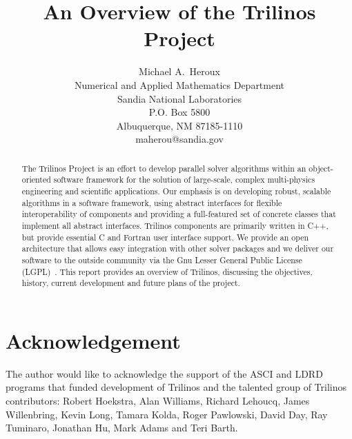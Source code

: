 \documentclass[12pt,strict]{SANDreport}
\title{An Overview of the Trilinos Project}
\author{Michael A.~Heroux\\
       Numerical and Applied Mathematics Department \\
	  Sandia National Laboratories\\
	  P.O. Box 5800\\
	  Albuquerque, NM 87185-1110 \\
	  maherou@sandia.gov \\
	 }
\date{}
\begin{document}
    \maketitle

    \begin{abstract}
The Trilinos Project is an effort to develop parallel solver algorithms within 
an object-oriented software framework for the solution of large-scale, complex
multi-physics engineering and scientific applications.   Our emphasis is on 
developing robust, scalable algorithms in a software framework, using abstract 
interfaces for flexible interoperability of components and providing a 
full-featured set of concrete classes that implement all abstract interfaces. 
Trilinos components are primarily written in C++, but provide essential C and 
Fortran user interface support.  We provide an open architecture that allows 
easy integration with other solver packages and we deliver our software to 
the outside community via the Gnu Lesser General Public License
(LGPL)~\cite{gnu-license-site}.
This report provides an overview of Trilinos, discussing the objectives, history,
current development and future plans of the project.
    \end{abstract}


    \clearpage
    \section*{Acknowledgement}
The author would like to acknowledge the support of the ASCI and LDRD programs
that funded development of Trilinos and the talented group of Trilinos contributors: 
Robert Hoekstra, Alan Williams, Richard Lehoucq, James Willenbring, Kevin Long, Tamara
Kolda, Roger Pawlowski, David Day, Ray Tuminaro, Jonathan Hu, Mark Adams and Teri
Barth.



    \clearpage
    \tableofcontents
    \listoffigures
    \listoftables
\end{document}
